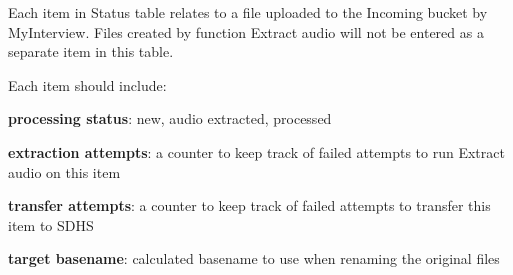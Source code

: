 \documentclass{article}
\renewcommand{\emph}[1]{\textbf{#1}}
\begin{document}
Each item in Status table relates to a file uploaded to the Incoming bucket by MyInterview. Files created by function Extract audio will not be entered as a separate item in this table.

Each item should include:
\begin{compactenum}
\item \emph{processing status}: new, audio extracted, processed
\item \emph{extraction attempts}: a counter to keep track of failed attempts to run Extract audio on this item
\item \emph{transfer attempts}: a counter to keep track of failed attempts to transfer this item to SDHS
\item \emph{target basename}: calculated basename to use when renaming the original files
\end{compactenum}
\end{document}
